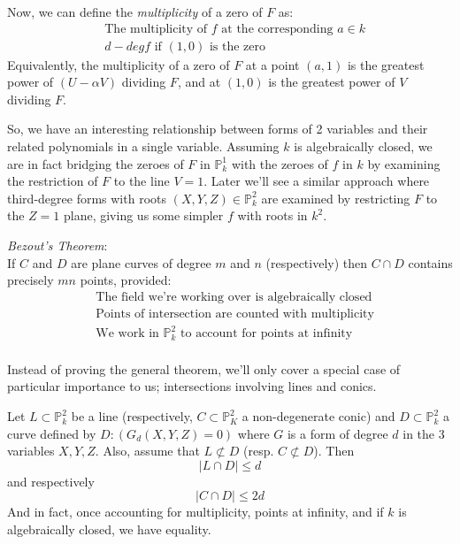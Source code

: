 Now, we can define the \emph{multiplicity} of a zero of $F$ as:
\begin{align*}
&\text{The multiplicity of $f$ at the corresponding $a \in k$} \tag{i}\\
&\text{$d - deg f$ if $(1,0)$ is the zero} \tag{ii}
\end{align*}
Equivalently, the multiplicity of a zero of $F$ at a point $(a,1)$
is the greatest power of $(U - \alpha V)$ dividing $F$, and at $(1,0)$
is the greatest power of $V$ dividing $F$.

So, we have an interesting relationship between forms of 2 variables and their
related polynomials in a single variable. Assuming $k$ is algebraically closed, we are in fact
bridging the zeroes of $F$ in $\mathbb{P}^1_k$ with the zeroes of $f$
in $k$ by examining the restriction of $F$ to the line $V=1$.
Later we'll see a similar approach where third-degree forms with roots
$(X,Y,Z) \in \mathbb{P}^2_k$ are examined by restricting $F$ to the
$Z=1$ plane, giving us some simpler $f$ with roots in $k^2$.

\begin{theorem}
\emph{Bezout's Theorem}:\\

If $C$ and $D$ are plane curves of degree $m$ and $n$ (respectively)
then $C \cap D$ contains precisely $mn$ points, provided:
\begin{align*}
&\text{The field we're working over is algebraically closed} \tag{i}\\
&\text{Points of intersection are counted with multiplicity} \tag{ii}\\
&\text{We work in $\mathbb{P}^2_k$ to account for points at infinity} \tag{iii}\\
\end{align*}
\end{theorem}

Instead of proving the general theorem, we'll only cover a special 
case of particular importance to us; intersections involving
lines and conics.

\begin{theorem}
Let $L \subset \mathbb{P}^2_k$ be a line (respectively, $C \subset \mathbb{P}^2_K$ a non-degenerate conic)
and $D \subset \mathbb{P}^2_k$ a curve defined by $D:(G_d(X,Y,Z)=0)$ where $G$ is
a form of degree $d$ in the 3 variables $X,Y,Z$. Also, assume that $L \not\subset D$ (resp. $C \not\subset D$).
Then
\[
|L \cap D| \le d
\]
and respectively
\[
|C \cap D| \le 2d
\]
And in fact, once accounting for multiplicity, points at infinity, and if $k$ is algebraically
closed, we have equality.
\end{theorem}

